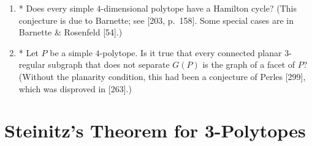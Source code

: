 \documentclass{article}
\begin{document}
\begin{enumerate}
\item* Does every simple $4$-dimensional polytope have a Hamilton cycle? (This conjecture is due to Barnette; see [203, p.~158]. Some special cases are in Barnette \& Rosenfeld [54].)

\item* Let $P$ be a simple $4$-polytope. Is it true that every connected planar $3$-regular subgraph that does not separate $G(P)$ is the graph of a facet of $P$? (Without the planarity condition, this had been a conjecture of Perles [299], which was disproved in [263].)

\end{enumerate}
\bigskip
\section{Steinitz's Theorem for 3-Polytopes}
\end{document}
